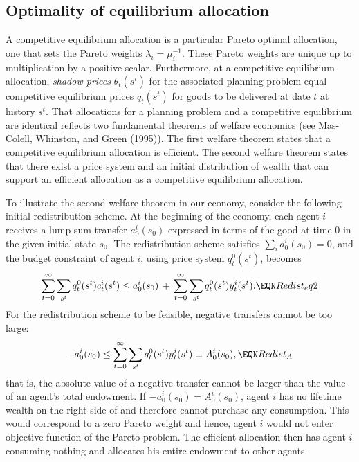 \subsection{Optimality of equilibrium 
                          allocation}\label{sec:PO}%
  A competitive  equilibrium allocation   is a particular Pareto
optimal allocation, one that sets the Pareto weights $\lambda_i =
\mu_i^{-1}$.  These Pareto weights are unique up to multiplication by a positive scalar. Furthermore, at a
competitive equilibrium allocation,  {\it shadow prices\/}
$\theta_t(s^t)$ for the associated planning problem equal  competitive equilibrium
prices $q_t(s^t)$ for goods to be delivered at date $t$
at  history $s^t$. %
 That  allocations for a planning
problem and a competitive equilibrium are identical reflects 
two fundamental theorems of welfare economics (see Mas-Colell,
Whinston, and Green (1995)).
The first welfare theorem states that a  competitive equilibrium allocation is efficient.
The second welfare theorem states that there exist a price system and  an initial distribution of wealth that can support an
  efficient allocation as a competitive equilibrium allocation.

To illustrate the second welfare theorem in our economy, 
consider the following initial redistribution scheme.
At the beginning of the economy, each agent $i$
receives a lump-sum transfer $a_0^i(s_0)$ expressed in 
terms of the good at time 0 in the given initial state
$s_0$. The redistribution scheme satisfies
$\sum_i a_0^i(s_0) = 0$, and the budget constraint of 
agent $i$, using price system $q^0_t(s^t)$,
 becomes 
$$ \sum_{t=0}^\infty \sum_{s^t}  q_t^0(s^t)  c_t^i(s^t)   \leq  
a_0^i(s_0) \,+\,
   \sum_{t=0}^\infty \sum_{s^t}  q_t^0(s^t) y_t^i(s^t).   \EQN Redist_eq2 $$
For the redistribution scheme to be feasible,
negative transfers cannot be too large:
$$ - a_0^i(s_0) \leq 
 \sum_{t=0}^\infty \sum_{s^t}  q_t^0(s^t) y_t^i(s^t)
  \equiv A_0^i(s_0),                    \EQN Redist_A
$$   
that is, the absolute value of a negative transfer 
cannot be larger than the value of an agent's total
endowment. If $ - a_0^i(s_0) = A_0^i(s_0)$, 
agent $i$ has no lifetime wealth on the 
right side of  and therefore  cannot
purchase any consumption. This would correspond to a zero 
Pareto weight and hence, agent $i$ would not
enter objective function  of the 
Pareto problem. The efficient allocation then  has 
agent $i$ consuming nothing and allocates  his entire 
endowment  to other agents.


